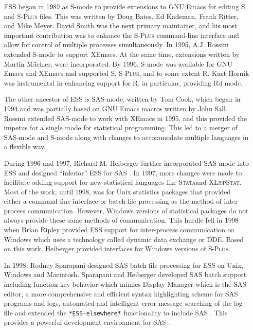 \documentclass{article}
\newcommand*{\SAS}{\textsc{SAS}{\textregistered} }
\newcommand*{\Splus}{\textsc{S-Plus}}
\newcommand*{\XLispStat}{\textsc{XLispStat}}
\newcommand*{\Stata}{\textsc{Stata}}
\newcommand{\stexttt}[1]{{\small\texttt{#1}}}
\begin{document}
ESS began in 1989 as S-mode to
provide extensions to GNU Emacs for editing S and \Splus{} files.  This
was written by Doug Bates, Ed Kademan, Frank Ritter, and
Mike Meyer.  David Smith was the next primary maintainer, and his most
important contribution was to enhance the \Splus{}
command-line interface and allow for control of multiple processes
simultaneously.  In 1995, A.J. Rossini extended S-mode to support
XEmacs.  At the same time, extensions written by Martin M{\"a}chler, were incorporated.
By 1996, S-mode was available for GNU Emacs and XEmacs and supported S, \Splus, and
to some extent R.  Kurt Hornik was instrumental in enhancing support
for R, in particular, providing Rd mode.

The other ancestor of ESS is SAS-mode,
written by Tom Cook, which began in 1994 and was partially based on
GNU Emacs macros written by John Sall.
Rossini extended SAS-mode to work with
XEmacs in 1995, and this provided the
impetus for a single mode for statistical programming.
This led to a merger of SAS-mode and S-mode along with changes
to accommodate multiple languages in a flexible way.

During 1996 and 1997, Richard M. Heiberger further incorporated
SAS-mode into ESS and designed ``inferior'' ESS for \SAS.  In
1997, more changes were made to facilitate
adding support for new statistical languages like \Stata and \XLispStat.
Most of the work, until 1998, was for Unix statistics packages
that provided either a command-line interface or batch file processing as the
method of inter-process communication.
However, Windows versions of statistical packages do not always provide
these same methods of communication.  This hurdle fell in 1998 when
Brian Ripley provided ESS support for inter-process communication on
Windows which uses a technology called dynamic data exchange or DDE.
Based on this work, Heiberger provided
interfaces for Windows versions of \Splus.

In 1998, Rodney Sparapani designed \SAS batch file processing for ESS
on Unix, Windows and Macintosh.
Sparapani and Heiberger developed \SAS batch support including function
key behavior which mimics Display Manager which is the \SAS editor,
a more comprehensive and efficient syntax highlighting scheme for \SAS
programs and logs,
automated and intelligent error message searching of the log file and extended the
\stexttt{*ESS-elsewhere*} functionality to include \SAS.  This provides
a powerful development environment for \SAS.
\end{document}
